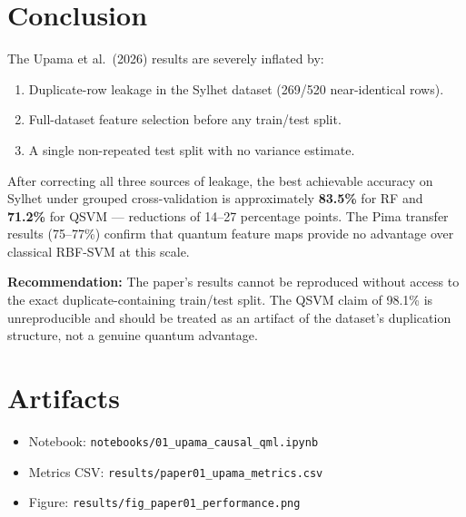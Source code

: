 \documentclass[12pt,a4paper]{article}
\begin{document}
\section{Conclusion}
The Upama et al.\ (2026) results are severely inflated by:
\begin{enumerate}
  \item Duplicate-row leakage in the Sylhet dataset (269/520 near-identical rows).
  \item Full-dataset feature selection before any train/test split.
  \item A single non-repeated test split with no variance estimate.
\end{enumerate}
After correcting all three sources of leakage, the best achievable accuracy on Sylhet under grouped cross-validation is approximately \textbf{83.5\%} for RF and \textbf{71.2\%} for QSVM --- reductions of 14--27 percentage points. The Pima transfer results (75--77\%) confirm that quantum feature maps provide no advantage over classical RBF-SVM at this scale.

\vspace{1em}
\noindent\textbf{Recommendation:} The paper's results cannot be reproduced without access to the exact duplicate-containing train/test split. The QSVM claim of 98.1\% is unreproducible and should be treated as an artifact of the dataset's duplication structure, not a genuine quantum advantage.

\appendix
\section{Artifacts}
\begin{itemize}
  \item Notebook: \texttt{notebooks/01\_upama\_causal\_qml.ipynb}
  \item Metrics CSV: \texttt{results/paper01\_upama\_metrics.csv}
  \item Figure: \texttt{results/fig\_paper01\_performance.png}
\end{itemize}
\end{document}
